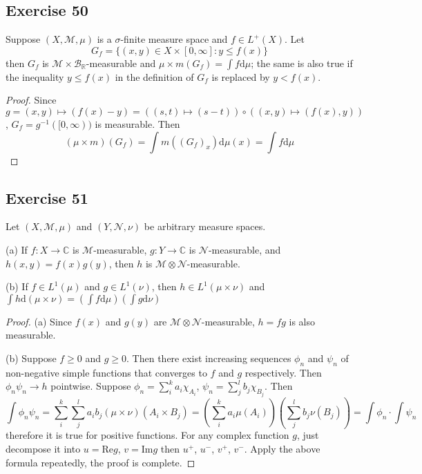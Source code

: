 \subsection*{Exercise 50}
Suppose $(X,\mathcal{M},\mu)$ is a $\sigma$-finite measure space and $f\in L^+(X)$. Let 
$$
G_f=\{(x,y)\in X\times[0,\infty]:y\le f(x)\}
$$
then $G_f$ is $\mathcal{M}\times\mathcal{B}_{\mathbb{R}}$-measurable and $\mu\times m(G_f)=\int f\mathrm{d}\mu$; the same is also true if the inequality $y\le f(x)$ in the definition of $G_f$ is replaced by $y<f(x)$.
\begin{proof}
    Since $g=(x,y)\mapsto(f(x)-y)=((s,t)\mapsto (s-t))\circ((x,y)\mapsto(f(x),y))$, $G_f=g^{-1}([0,\infty))$ is measurable. Then
    $$
    (\mu\times m)(G_f)=\int m((G_f)_x)\mathrm{d}\mu(x)=\int f\mathrm{d}\mu
    $$
\end{proof}
\subsection*{Exercise 51}
Let $(X,\mathcal{M},\mu)$ and $(Y,\mathcal{N},\nu)$ be arbitrary measure spaces.
\par (a) If $f:X\to\mathbb{C}$ is $\mathcal{M}$-measurable, $g:Y\to\mathbb{C}$ is $\mathcal{N}$-measurable, and $h(x,y)=f(x)g(y)$, then $h$ is $\mathcal{M}\otimes\mathcal{N}$-measurable.
\par (b) If $f\in L^1(\mu)$ and $g\in L^1(\nu)$, then $h\in L^1(\mu\times\nu)$ and $\int h\mathrm{d}(\mu\times\nu)=(\int f\mathrm{d}\mu)(\int g\mathrm{d}\nu)$
\begin{proof}
    \par (a) Since $f(x)$ and $g(y)$ are $\mathcal{M}\otimes\mathcal{N}$-measurable, $h=fg$ is also measurable.
    \par (b) Suppose $f\ge 0$ and $g\ge 0$. Then there exist increasing sequences $\phi_n$ and $\psi_n$ of non-negative simple functions that converges to $f$ and $g$ respectively. Then $\phi_n\psi_n\to h$ pointwise. Suppose $\phi_n=\sum^k_ia_i\chi_{A_i}$, $\psi_n=\sum^l_jb_j\chi_{B_j}$. Then
    $$
    \int\phi_n\psi_n=\sum^k_i\sum^l_ja_ib_j(\mu\times\nu)(A_i\times B_j)=\left(\sum^k_ia_i\mu(A_i)\right)\left(\sum^l_jb_j\nu(B_j)\right)=\int\phi_n\cdot\int\psi_n
    $$
    therefore it is true for positive functions. For any complex function $g$, just decompose it into $u=\mathrm{Re}g$, $v=\mathrm{Im}g$ then $u^+$, $u^-$, $v^+$, $v^-$. Apply the above formula repeatedly, the proof is complete.
\end{proof}
